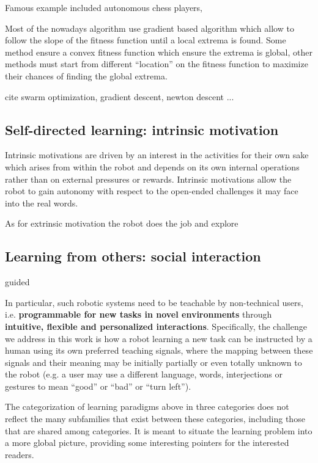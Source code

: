 Famous example included autonomous chess players, 


Most of the nowadays algorithm use gradient based algorithm which allow to follow the slope of the fitness function until a local extrema is found. Some method ensure a convex fitness function which ensure the extrema is global, other methods must start from different ``location'' on the fitness function to maximize their chances of finding the global extrema. 

cite swarm optimization, gradient descent, newton descent ...

\subsection{Self-directed learning: intrinsic motivation}

Intrinsic motivations are driven by an interest in the activities for their own sake which arises from within the robot and depends on its own internal operations rather than on external pressures or rewards. Intrinsic motivations allow the robot to gain autonomy with respect to the open-ended challenges it may face into the real words. 

As for extrinsic motivation the robot does the job and explore

\subsection{Learning from others: social interaction}
\label{sec:intro:paradigms:social}

guided

%
In particular, such robotic systems need to be teachable by non-technical users, i.e. \textbf{programmable for new tasks in novel environments} through \textbf{intuitive, flexible and personalized interactions}. Specifically, the challenge we address in this work is how a robot learning a new task can be instructed by a human using its own preferred teaching signals, where the mapping between these signals and their meaning may be initially partially or even totally unknown to the robot (e.g. a user may use a different language, words, interjections or gestures to mean ``good'' or ``bad'' or ``turn left'').

The categorization of learning paradigms above in three categories does not reflect the many subfamilies that exist between these categories, including those that are shared among categories. It is meant to situate the learning problem into a more global picture, providing some interesting pointers for the interested readers. 

